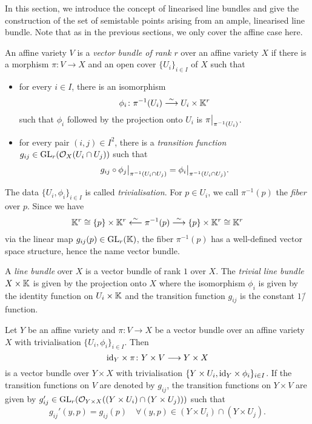 In this section, we introduce the concept of linearised line bundles and give the construction of the set of semistable points arising from an ample, linearised line bundle. Note that as in the previous sections, we only cover the affine case here.

\begin{defi}
	An affine variety $V$ is a \emph{vector bundle of rank $r$} over an affine variety $X$ if there is a morphism $\pi\colon V \rightarrow X$ and an open cover $\{U_i\}_{i\in I}$ of $X$ such that
	\begin{itemize}
		\item for every $i\in I$, there is an isomorphism
			$$\phi_i\colon \pi^{-1}(U_i) \overset{\sim}{\longrightarrow} U_i \times \mathbb{K}^r$$
			such that $\phi_i$ followed by the projection onto $U_i$ is $\pi{\big |_{\pi^{-1}(U_i)}}$.
		\item for every pair $(i,j)\in I^2$, there is a \emph{transition function} $g_{ij}\in \text{GL}_r(\mathcal{O}_X(U_i\cap U_j))$ such that
		$$g_{ij} \circ \phi_j{\big |_{\pi^{-1}(U_i\cap U_j)}} =  \phi_i{\big |_{\pi^{-1}(U_i\cap U_j)}}.$$
	\end{itemize}
	The data $\{U_i,\phi_i\}_{i\in I}$ is called \emph{trivialisation}. For $p\in U_i$, we call $\pi^{-1}(p)$ the \emph{fiber} over $p$. Since we have 
	$$\mathbb{K}^r \cong \{p\}\times \mathbb{K}^r \overset{\sim}{\longleftarrow} \pi^{-1}(p) \overset{\sim}{\longrightarrow} \{p\}\times \mathbb{K}^r \cong \mathbb{K}^r$$
	via the linear map $g_{ij}(p)\in\text{GL}_r(\mathbb{K})$, the fiber $\pi^{-1}(p)$ has a well-defined vector space structure, hence the name vector bundle.
	
	A \emph{line bundle} over $X$ is a vector bundle of rank $1$ over $X$. The \emph{trivial line bundle} $X\times\mathbb{K}$ is given by the projection onto $X$ where the isomorphism $\phi_i$ is given by the identity function on $U_i\times\mathbb{K}$ and the transition function $g_{ij}$ is the constant $1$\=/function.
\end{defi}

\begin{remark}
	Let $Y$ be an affine variety and $\pi\colon V \rightarrow X$ be a vector bundle over an affine variety $X$ with trivialisation $\{U_i,\phi_i\}_{i\in I}$. Then 
	$$\text{id}_Y \times \pi\colon Y\times V \longrightarrow Y\times X$$
	is a vector bundle over $Y\times X$ with trivialisation $\{Y\times U_i,\text{id}_Y \times \phi_i\}_{i\in I}$. If the transition functions on $V$ are denoted by $g_{ij}$, the transition functions on $Y\times V$ are given by
	$g_{ij}'\in \text{GL}_r(\mathcal{O}_{Y\times X}((Y\times U_i) \cap (Y \times U_j)))$ such that
	$$g_{ij}'(y,p) = g_{ij}(p)\quad \forall (y,p)\in(Y\times U_i) \cap (Y \times U_j).$$
\end{remark}

